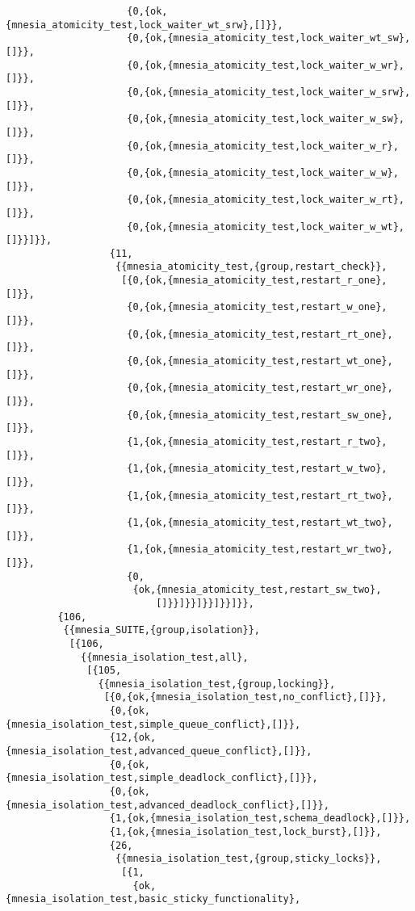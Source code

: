 \begin{verbatim}
                     {0,{ok,{mnesia_atomicity_test,lock_waiter_wt_srw},[]}},
                     {0,{ok,{mnesia_atomicity_test,lock_waiter_wt_sw},[]}},
                     {0,{ok,{mnesia_atomicity_test,lock_waiter_w_wr},[]}},
                     {0,{ok,{mnesia_atomicity_test,lock_waiter_w_srw},[]}},
                     {0,{ok,{mnesia_atomicity_test,lock_waiter_w_sw},[]}},
                     {0,{ok,{mnesia_atomicity_test,lock_waiter_w_r},[]}},
                     {0,{ok,{mnesia_atomicity_test,lock_waiter_w_w},[]}},
                     {0,{ok,{mnesia_atomicity_test,lock_waiter_w_rt},[]}},
                     {0,{ok,{mnesia_atomicity_test,lock_waiter_w_wt},[]}}]}},
                  {11,
                   {{mnesia_atomicity_test,{group,restart_check}},
                    [{0,{ok,{mnesia_atomicity_test,restart_r_one},[]}},
                     {0,{ok,{mnesia_atomicity_test,restart_w_one},[]}},
                     {0,{ok,{mnesia_atomicity_test,restart_rt_one},[]}},
                     {0,{ok,{mnesia_atomicity_test,restart_wt_one},[]}},
                     {0,{ok,{mnesia_atomicity_test,restart_wr_one},[]}},
                     {0,{ok,{mnesia_atomicity_test,restart_sw_one},[]}},
                     {1,{ok,{mnesia_atomicity_test,restart_r_two},[]}},
                     {1,{ok,{mnesia_atomicity_test,restart_w_two},[]}},
                     {1,{ok,{mnesia_atomicity_test,restart_rt_two},[]}},
                     {1,{ok,{mnesia_atomicity_test,restart_wt_two},[]}},
                     {1,{ok,{mnesia_atomicity_test,restart_wr_two},[]}},
                     {0,
                      {ok,{mnesia_atomicity_test,restart_sw_two},
                          []}}]}}]}}]}}]}},
         {106,
          {{mnesia_SUITE,{group,isolation}},
           [{106,
             {{mnesia_isolation_test,all},
              [{105,
                {{mnesia_isolation_test,{group,locking}},
                 [{0,{ok,{mnesia_isolation_test,no_conflict},[]}},
                  {0,{ok,{mnesia_isolation_test,simple_queue_conflict},[]}},
                  {12,{ok,{mnesia_isolation_test,advanced_queue_conflict},[]}},
                  {0,{ok,{mnesia_isolation_test,simple_deadlock_conflict},[]}},
                  {0,{ok,{mnesia_isolation_test,advanced_deadlock_conflict},[]}},
                  {1,{ok,{mnesia_isolation_test,schema_deadlock},[]}},
                  {1,{ok,{mnesia_isolation_test,lock_burst},[]}},
                  {26,
                   {{mnesia_isolation_test,{group,sticky_locks}},
                    [{1,
                      {ok,{mnesia_isolation_test,basic_sticky_functionality},

\end{verbatim}
